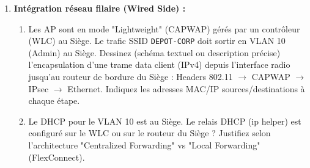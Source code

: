 \documentclass[11pt]{article}
\begin{document}
\begin{exercice}
\begin{enumerate}
    \item \textbf{Intégration réseau filaire (Wired Side) :} 
    \begin{enumerate}
        \item Les AP sont en mode "Lightweight" (CAPWAP) gérés par un contrôleur (WLC) au Siège. Le trafic SSID \texttt{DEPOT-CORP} doit sortir en VLAN 10 (Admin) au Siège. Dessinez (schéma textuel ou description précise) l'encapsulation d'une trame data client (IPv4) depuis l'interface radio jusqu'au routeur de bordure du Siège : Headers 802.11 $\to$ CAPWAP $\to$ IPsec $\to$ Ethernet. Indiquez les adresses MAC/IP sources/destinations à chaque étape.
        \item Le DHCP pour le VLAN 10 est au Siège. Le relais DHCP (ip helper) est configuré sur le WLC ou sur le routeur du Siège ? Justifiez selon l'architecture "Centralized Forwarding" vs "Local Forwarding" (FlexConnect).
    \end{enumerate}
\end{enumerate}
\end{exercice}
\end{document}
